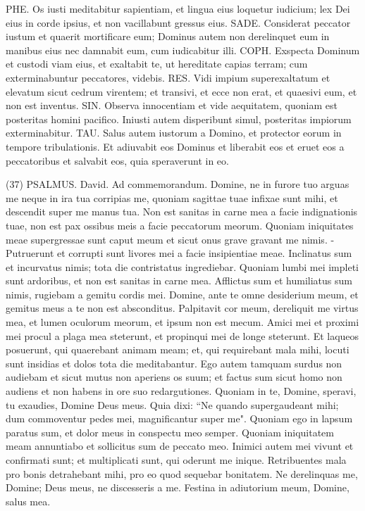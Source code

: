 \begin{biblechapter}
\verse PHE. Os iusti meditabitur sapientiam, et lingua eius loquetur iudicium; 
\verse lex Dei eius in corde ipsius, et non vacillabunt gressus eius. 
\verse SADE. Considerat peccator iustum et quaerit mortificare eum; 
\verse Dominus autem non derelinquet eum in manibus eius nec damnabit eum, cum iudicabitur illi. 
\verse COPH. Exspecta Dominum et custodi viam eius, et exaltabit te, ut hereditate capias terram; cum exterminabuntur peccatores, videbis. 
\verse RES. Vidi impium superexaltatum et elevatum sicut cedrum virentem; 
\verse et transivi, et ecce non erat, et quaesivi eum, et non est inventus. 
\verse SIN. Observa innocentiam et vide aequitatem, quoniam est posteritas homini pacifico. 
\verse Iniusti autem disperibunt simul, posteritas impiorum exterminabitur. 
\verse TAU. Salus autem iustorum a Domino, et protector eorum in tempore tribulationis. 
\verse Et adiuvabit eos Dominus et liberabit eos et eruet eos a peccatoribus et salvabit eos, quia speraverunt in eo. 
\end{biblechapter}

\begin{biblechapter}  (37) 
\verse  PSALMUS. David. Ad commemorandum. 
\verse Domine, ne in furore tuo arguas me neque in ira tua corripias me, 
\verse quoniam sagittae tuae infixae sunt mihi, et descendit super me manus tua. 
\verse Non est sanitas in carne mea a facie indignationis tuae, non est pax ossibus meis a facie peccatorum meorum. 
\verse Quoniam iniquitates meae supergressae sunt caput meum et sicut onus grave gravant me nimis. - 
\verse Putruerunt et corrupti sunt livores mei a facie insipientiae meae. 
\verse Inclinatus sum et incurvatus nimis; tota die contristatus ingrediebar. 
\verse Quoniam lumbi mei impleti sunt ardoribus, et non est sanitas in carne mea. 
\verse Afflictus sum et humiliatus sum nimis, rugiebam a gemitu cordis mei. 
\verse Domine, ante te omne desiderium meum, et gemitus meus a te non est absconditus. 
\verse Palpitavit cor meum, dereliquit me virtus mea, et lumen oculorum meorum, et ipsum non est mecum. 
\verse Amici mei et proximi mei procul a plaga mea steterunt, et propinqui mei de longe steterunt. 
\verse Et laqueos posuerunt, qui quaerebant animam meam; et, qui requirebant mala mihi, locuti sunt insidias et dolos tota die meditabantur. 
\verse Ego autem tamquam surdus non audiebam et sicut mutus non aperiens os suum; 
\verse et factus sum sicut homo non audiens et non habens in ore suo redargutiones. 
\verse Quoniam in te, Domine, speravi, tu exaudies, Domine Deus meus. 
\verse Quia dixi: “Ne quando supergaudeant mihi; dum commoventur pedes mei, magnificantur super me". 
\verse Quoniam ego in lapsum paratus sum, et dolor meus in conspectu meo semper. 
\verse Quoniam iniquitatem meam annuntiabo et sollicitus sum de peccato meo. 
\verse Inimici autem mei vivunt et confirmati sunt; et multiplicati sunt, qui oderunt me inique. 
\verse Retribuentes mala pro bonis detrahebant mihi, pro eo quod sequebar bonitatem. 
\verse Ne derelinquas me, Domine; Deus meus, ne discesseris a me. 
\verse Festina in adiutorium meum, Domine, salus mea. 
\end{biblechapter}

